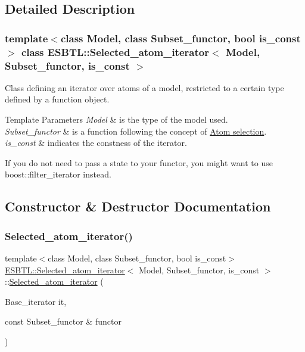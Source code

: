 \subsection{Detailed Description}
\subsubsection*{template$<$class Model, class Subset\+\_\+functor, bool is\+\_\+const$>$\newline
class E\+S\+B\+T\+L\+::\+Selected\+\_\+atom\+\_\+iterator$<$ Model, Subset\+\_\+functor, is\+\_\+const $>$}

Class defining an iterator over atoms of a model, restricted to a certain type defined by a function object. 
\begin{DoxyTemplParams}{Template Parameters}
{\em Model} & is the type of the model used. \\
\hline
{\em Subset\+\_\+functor} & is a function following the concept of \hyperlink{group__atomsel}{Atom selection}. \\
\hline
{\em is\+\_\+const} & indicates the constness of the iterator.\\
\hline
\end{DoxyTemplParams}
If you do not need to pass a state to your functor, you might want to use boost\+::filter\+\_\+iterator instead. 

\subsection{Constructor \& Destructor Documentation}
\mbox{\label{classESBTL_1_1Selected__atom__iterator_a90cd448bdf3d57cd774c0bbcfbe402df}} 
\subsubsection{\texorpdfstring{Selected\+\_\+atom\+\_\+iterator()}{Selected\_atom\_iterator()}\hspace{0.1cm}{\footnotesize\ttfamily [1/2]}}
{\footnotesize\ttfamily template$<$class Model, class Subset\+\_\+functor, bool is\+\_\+const$>$ \\
\hyperlink{classESBTL_1_1Selected__atom__iterator}{E\+S\+B\+T\+L\+::\+Selected\+\_\+atom\+\_\+iterator}$<$ Model, Subset\+\_\+functor, is\+\_\+const $>$\+::\hyperlink{classESBTL_1_1Selected__atom__iterator}{Selected\+\_\+atom\+\_\+iterator} (\begin{DoxyParamCaption}\item[{Base\+\_\+iterator}]{it,  }\item[{const Subset\+\_\+functor \&}]{functor }\end{DoxyParamCaption})\hspace{0.3cm}{\ttfamily [inline]}}

